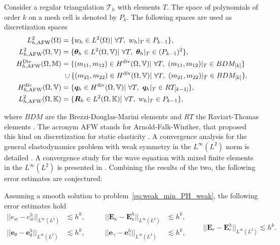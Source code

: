 Consider a regular triangulation $\mathcal{T}_h$ with elements $T$. The space of polynomials of order $k$ on a mesh cell is denoted by $P_k$. The following spaces are used as discretization spaces
\begin{equation}
\label{eq:AFW}
\begin{aligned}
L_{h, \text{AFW}}^2(\Omega) &= \{w_h \in L^2(\Omega) | \ \forall T, \ w_h|_{T} \in P_{k-1} \}, \\
L_{h, \text{AFW}}^2(\Omega, \mathbb{V}) &= \{\bm{\theta}_h \in L^2(\Omega, \mathbb{V}) | \ \forall T,\ \bm{\theta}_h|_{T} \in (P_{k-1})^2 \}, \\
H_{h, \text{AFW}}^{\Div}(\Omega, \mathbb{M}) &= \{(m_{11}, m_{12}) \in H^{\div}(\Omega, \mathbb{V})| \ \forall T,\ (m_{11}, m_{12})|_{T} \in BDM_{[k]} \}  \\
& \; \cup \{(m_{21}, m_{22}) \in H^{\div}(\Omega, \mathbb{V})| \ \forall T,\ (m_{21}, m_{22})|_{T} \in BDM_{[k]} \}, \\
H_{h, \text{AFW}}^{\div}(\Omega, \mathbb{V}) &= \{\bm{q}_h \in H^{\div}(\Omega, \mathbb{V}) | \ \forall T,\ \bm{q}_h|_{T} \in RT_{[k-1]} \}, \\
L_{h, \text{AFW}}^2(\Omega, \mathbb{K}) &= \{\bm{R}_h \in L^2(\Omega, \mathbb{K}) | \ \forall T, \ w_h|_{T} \in P_{k-1} \}, \\ 
\end{aligned}
\end{equation}

where $BDM$ are the Brezzi-Douglas-Marini elements \cite{brezzi1985bdm} and $RT$ the Raviart-Thomas elements \cite{raviart1977}. The acronym AFW stands for Arnold-Falk-Winther, that proposed this kind on discretization for static elasticity \cite{arnold2007mixed}. A convergence analysis for the general elastodynamics problem with weak symmetry in the $L^\infty (L^2)$ norm is detailed \cite{arnold2014elastodynamics}. A convergence study for the wave equation with mixed finite elements in the $L^\infty (L^2)$ is presented in \cite{geveci1988}. Combining the results of the two, the following error estimates are conjectured:
\begin{conjecture}\label{conj:AWFestimates}
	Assuming a smooth solution to problem~\eqref{eq:weak_min_PH_weak}, the following error estimates hold 
	\begin{equation}
	\label{eq:errAFW}
	\begin{aligned}
	||e_w - e_w^h||_{L^{\infty}(L^2)} &\lesssim h^{k}, \\
	||\bm{e}_\theta - \bm{e}_\theta^h||_{L^{\infty}(L^2)} &\lesssim h^{k}, \\
	\end{aligned} \qquad
	\begin{aligned}
	||\bm{E}_\kappa - \bm{E}_\kappa^h||_{L^{\infty}(L^2)} &\lesssim  h^{k}, \\
	||\bm{e}_\gamma - \bm{e}_\gamma^ h||_{L^{\infty}(L^2)} &\lesssim  h^{k}, \\
	\end{aligned} \qquad
	||\bm{E}_r - \bm{E}_r^h||_{L^{\infty}(L^2)} \lesssim h^{k}. 
	\end{equation}
\end{conjecture}


